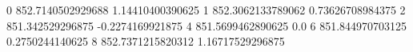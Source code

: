 0 852.7140502929688 1.14410400390625
1 852.3062133789062 0.73626708984375
2 851.342529296875 -0.2274169921875
4 851.5699462890625 0.0
6 851.844970703125 0.2750244140625
8 852.7371215820312 1.16717529296875
